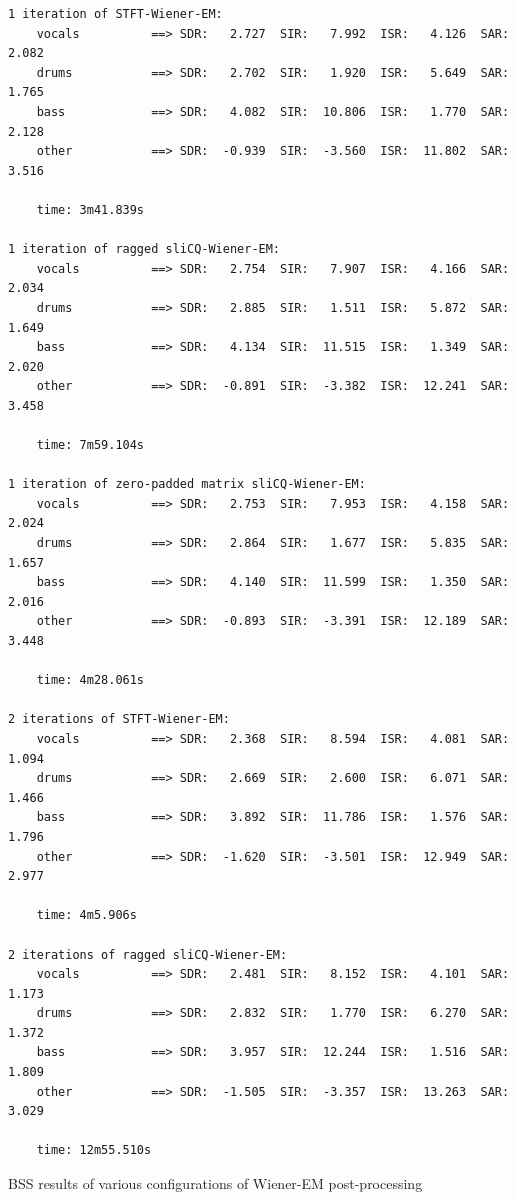 \documentclass[report.tex]{subfiles}
\begin{document}
\begin{listing}[h]
  \centering
\begin{verbatim}
1 iteration of STFT-Wiener-EM:
    vocals          ==> SDR:   2.727  SIR:   7.992  ISR:   4.126  SAR:   2.082
    drums           ==> SDR:   2.702  SIR:   1.920  ISR:   5.649  SAR:   1.765
    bass            ==> SDR:   4.082  SIR:  10.806  ISR:   1.770  SAR:   2.128
    other           ==> SDR:  -0.939  SIR:  -3.560  ISR:  11.802  SAR:   3.516

    time: 3m41.839s

1 iteration of ragged sliCQ-Wiener-EM:
    vocals          ==> SDR:   2.754  SIR:   7.907  ISR:   4.166  SAR:   2.034
    drums           ==> SDR:   2.885  SIR:   1.511  ISR:   5.872  SAR:   1.649
    bass            ==> SDR:   4.134  SIR:  11.515  ISR:   1.349  SAR:   2.020
    other           ==> SDR:  -0.891  SIR:  -3.382  ISR:  12.241  SAR:   3.458

    time: 7m59.104s

1 iteration of zero-padded matrix sliCQ-Wiener-EM:
    vocals          ==> SDR:   2.753  SIR:   7.953  ISR:   4.158  SAR:   2.024
    drums           ==> SDR:   2.864  SIR:   1.677  ISR:   5.835  SAR:   1.657
    bass            ==> SDR:   4.140  SIR:  11.599  ISR:   1.350  SAR:   2.016
    other           ==> SDR:  -0.893  SIR:  -3.391  ISR:  12.189  SAR:   3.448

    time: 4m28.061s

2 iterations of STFT-Wiener-EM:
    vocals          ==> SDR:   2.368  SIR:   8.594  ISR:   4.081  SAR:   1.094
    drums           ==> SDR:   2.669  SIR:   2.600  ISR:   6.071  SAR:   1.466
    bass            ==> SDR:   3.892  SIR:  11.786  ISR:   1.576  SAR:   1.796
    other           ==> SDR:  -1.620  SIR:  -3.501  ISR:  12.949  SAR:   2.977

    time: 4m5.906s

2 iterations of ragged sliCQ-Wiener-EM:
    vocals          ==> SDR:   2.481  SIR:   8.152  ISR:   4.101  SAR:   1.173
    drums           ==> SDR:   2.832  SIR:   1.770  ISR:   6.270  SAR:   1.372
    bass            ==> SDR:   3.957  SIR:  12.244  ISR:   1.516  SAR:   1.809
    other           ==> SDR:  -1.505  SIR:  -3.357  ISR:  13.263  SAR:   3.029

    time: 12m55.510s
\end{verbatim}
  \caption{BSS results of various configurations of Wiener-EM post-processing}
  \label{lst:wienerem}
\end{listing}
\end{document}
